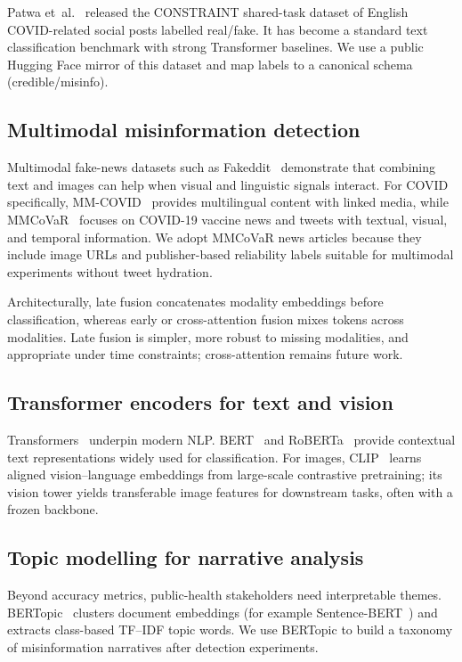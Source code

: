 \documentclass[12pt, a4paper]{report}
\begin{document}
Patwa et~al.~\cite{patwa2021fighting} released the CONSTRAINT shared-task dataset of English COVID-related social posts labelled real/fake.
It has become a standard text classification benchmark with strong Transformer baselines.
We use a public Hugging Face mirror of this dataset and map labels to a canonical schema (credible/misinfo).

\subsection{Multimodal misinformation detection}

Multimodal fake-news datasets such as Fakeddit~\cite{nakamura2020fakeddit} demonstrate that combining text and images can help when visual and linguistic signals interact.
For COVID specifically, MM-COVID~\cite{li2020mmcovid} provides multilingual content with linked media, while MMCoVaR~\cite{chen2021mmcovar} focuses on COVID-19 vaccine news and tweets with textual, visual, and temporal information.
We adopt MMCoVaR news articles because they include image URLs and publisher-based reliability labels suitable for multimodal experiments without tweet hydration.

Architecturally, late fusion concatenates modality embeddings before classification, whereas early or cross-attention fusion mixes tokens across modalities.
Late fusion is simpler, more robust to missing modalities, and appropriate under time constraints; cross-attention remains future work.

\subsection{Transformer encoders for text and vision}

Transformers~\cite{vaswani2017attention} underpin modern NLP.
BERT~\cite{devlin2019bert} and RoBERTa~\cite{liu2019roberta} provide contextual text representations widely used for classification.
For images, CLIP~\cite{radford2021clip} learns aligned vision--language embeddings from large-scale contrastive pretraining; its vision tower yields transferable image features for downstream tasks, often with a frozen backbone.

\subsection{Topic modelling for narrative analysis}

Beyond accuracy metrics, public-health stakeholders need interpretable themes.
BERTopic~\cite{grootendorst2022bertopic} clusters document embeddings (for example Sentence-BERT~\cite{reimers2019sentence}) and extracts class-based TF--IDF topic words.
We use BERTopic to build a taxonomy of misinformation narratives after detection experiments.
\end{document}
